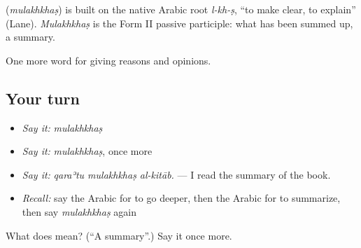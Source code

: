 \begin{cousinweb}
\textbf{} (\emph{mulakhkhaṣ}) is built on the native Arabic root \emph{l-kh-ṣ}, \textquotedblleft{}to make clear, to explain\textquotedblright{} (Lane). \emph{Mulakhkhaṣ} is the Form II passive participle: what has been summed up, a summary.
\end{cousinweb}

\begin{grammarlens}[title={What you've built}]
One more word for giving reasons and opinions.
\end{grammarlens}

\subsection*{Your turn}
\begin{itemize}
\raggedright
  \item \emph{Say it:} \emph{mulakhkhaṣ}
  \item \emph{Say it:} \emph{mulakhkhaṣ}, once more
  \item \emph{Say it:} \emph{qaraʾtu mulakhkhaṣ al-kitāb.} — I read the summary of the book.
  \item \emph{Recall:} say the Arabic for to go deeper, then the Arabic for to summarize, then say \emph{mulakhkhaṣ} again
\end{itemize}

\begin{tcolorbox}[breakable,colback=teal!4,colframe=teal!35!black,title={Before you move on}]
What does  mean? (\textquotedblleft{}A summary\textquotedblright{}.) Say it once more.
\end{tcolorbox}

